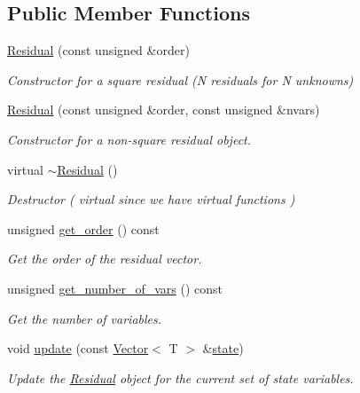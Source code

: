 \subsection*{Public Member Functions}
\begin{DoxyCompactItemize}
\item 
\hyperlink{classLuna_1_1Residual_a6d918065d5ad8f65e5d226b9903af0cd}{Residual} (const unsigned \&order)
\begin{DoxyCompactList}\small\item\em Constructor for a \textquotesingle{}square\textquotesingle{} residual (N residuals for N unknowns) \end{DoxyCompactList}\item 
\hyperlink{classLuna_1_1Residual_a7c109fba68ee9658d4e2a81929c4c2cd}{Residual} (const unsigned \&order, const unsigned \&nvars)
\begin{DoxyCompactList}\small\item\em Constructor for a \textquotesingle{}non-\/square\textquotesingle{} residual object. \end{DoxyCompactList}\item 
virtual \hyperlink{classLuna_1_1Residual_a49919ce545464441f326d3be815241af}{$\sim$\+Residual} ()
\begin{DoxyCompactList}\small\item\em Destructor ( virtual since we have virtual functions ) \end{DoxyCompactList}\item 
unsigned \hyperlink{classLuna_1_1Residual_a866342c8d328177ea3f00c16d929cb0e}{get\+\_\+order} () const
\begin{DoxyCompactList}\small\item\em Get the order of the residual vector. \end{DoxyCompactList}\item 
unsigned \hyperlink{classLuna_1_1Residual_aa64479978dfc1879345e5b650881c488}{get\+\_\+number\+\_\+of\+\_\+vars} () const
\begin{DoxyCompactList}\small\item\em Get the number of variables. \end{DoxyCompactList}\item 
void \hyperlink{classLuna_1_1Residual_ac1f39e77c729e6a4a1e10ac951f6c704}{update} (const \hyperlink{classLuna_1_1Vector}{Vector}$<$ T $>$ \&\hyperlink{classLuna_1_1Residual_a41d9f863aa529f16c5d78fb19b4906bd}{state})
\begin{DoxyCompactList}\small\item\em Update the \hyperlink{classLuna_1_1Residual}{Residual} object for the current set of state variables. \end{DoxyCompactList}\item 

\end{DoxyCompactItemize}
